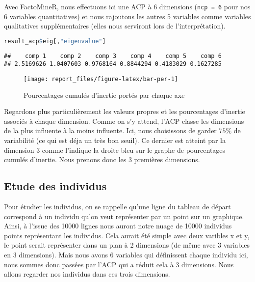 \documentclass[
  11pt,
  xcolor = usenames,dvipsnames]{article}
\newcommand{\passthrough}[1]{#1}
\begin{document}
Avec FactoMineR, nous effectuons ici une ACP à 6 dimensions (\passthrough{\lstinline!ncp = 6!} pour nos 6 variables quantitatives) et
nous rajoutons les autres 5 variables comme variables qualitatives supplémentaires
(elles nous serviront lors de l'interprétation).

\begin{lstlisting}[language=R]
result_acp$eig[,"eigenvalue"]
\end{lstlisting}

\begin{lstlisting}
##    comp 1    comp 2    comp 3    comp 4    comp 5    comp 6 
## 2.5169626 1.0407603 0.9768164 0.8844294 0.4183029 0.1627285
\end{lstlisting}

\begin{figure}

{\centering \texttt{[image: report\_files/figure-latex/bar-per-1]} 

}

\caption{Pourcentages cumulés d'inertie portés par chaque axe}\label{fig:bar-per}
\end{figure}

Regardons plus particulièrement les valeurs propres et les pourcentages d'inertie associés à chaque dimension.
Comme on s'y attend, l'ACP classe les dimensions de la plus influente à la moins influente.
Ici, nous choisissons de garder \(75\%\) de variabilité (ce qui est déja un très bon seuil).
Ce dernier est atteint par la dimension 3 comme l'indique la droite bleu sur le graphe de pourcentages cumulés d'inertie.
Nous prenons donc les 3 premières dimensions.

\hypertarget{etude-des-individus}{%
\subsection{Etude des individus}\label{etude-des-individus}}

Pour étudier les individus, on se rappelle qu'une ligne du tableau de départ correspond à un individu qu'on veut représenter par un point sur un graphique.
Ainsi, à l'issue des 10000 lignes nous auront notre nuage de 10000 individus points représentant les individus. Cela aurait été simple avec deux varibles x et y, le point serait représenter dans un plan à 2 dimensions (de même avec 3 variables en 3 dimensions).
Mais nous avons 6 variables qui définissent chaque individu ici, nous sommes donc passées par l'ACP qui a réduit cela à 3 dimensions. Nous
allons regarder nos individus dans ces trois dimensions.
\end{document}

